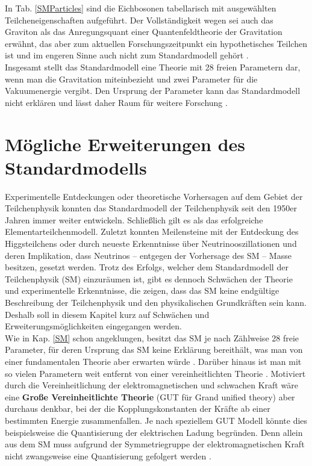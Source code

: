 In Tab. \ref{SMParticles} sind die Eichbosonen tabellarisch mit ausgewählten Teilcheneigenschaften aufgeführt. 
Der Vollständigkeit wegen sei auch das Graviton als das Anregungsquant einer Quantenfeldtheorie der Gravitation erwähnt, das aber zum aktuellen Forschungs\-zeit\-punkt ein hypothetisches Teilchen ist und im engeren Sinne auch nicht zum Standardmodell gehört \cite{Cottingham}.\\
Insgesamt stellt das Standardmodell eine Theorie mit 28 freien Parametern dar, wenn man die Gravitation miteinbezieht und zwei Parameter für die Vakuumenergie vergibt. Den Ursprung der Parameter kann das Standardmodell nicht erklären und lässt daher Raum für weitere Forschung \cite{Mann}.
\section{Mögliche Erweiterungen des Standardmodells}\label{Erweiterung}%
Experimentelle Entdeckungen oder theoretische Vorhersagen auf dem Gebiet der Teilchenphysik konnten das Standardmodell der Teilchenphysik seit den 1950er Jahren immer weiter entwickeln. Schließlich gilt es als das erfolgreiche Elementarteilchenmodell. Zuletzt konnten Meilensteine mit der Entdeckung des Higgsteilchens oder durch neueste Erkenntnisse über Neutrinooszillationen und deren Implikation, dass Neutrinos -- entgegen der Vorhersage des SM -- Masse besitzen, gesetzt werden. Trotz des Erfolgs, welcher dem Standardmodell der Teilchenphysik (SM) einzuräumen ist, gibt es dennoch Schwächen der Theorie und experimentelle Erkenntnisse, die zeigen, dass das SM keine endgültige Beschreibung der Teilchenphysik und den phy\-si\-kalischen Grundkräften sein kann. Deshalb soll in diesem Kapitel kurz auf Schwächen und Erweiterungsmöglichkeiten eingegangen werden.\\

Wie in Kap. \ref{SM} schon angeklungen, besitzt das SM je nach Zählweise 28 freie Parameter, für deren Ursprung das SM keine Erklärung bereithält, was man von einer fundamentalen Theorie aber erwarten würde \cite{PhysTeV}. Darüber hinaus ist man mit so vielen Parametern weit entfernt von einer vereinheitlichten Theorie \cite{Nagashima}. Motiviert durch die Vereinheitlichung der elektromagnetischen und schwachen Kraft wäre eine \textbf{Große Vereinheitlichte Theorie} (GUT für Grand unified theory) aber durchaus denkbar, bei der die Kopplungskonstanten der Kräfte ab einer bestimmten Energie zusammenfallen. Je nach speziellem GUT Modell könnte dies beispielsweise die Quantisierung der elektrischen Ladung begründen. Denn allein aus dem SM muss aufgrund der Symmetriegruppe der elektromagnetischen Kraft nicht zwangsweise eine Quantisierung gefolgert werden \cite{Nagashima}. %

